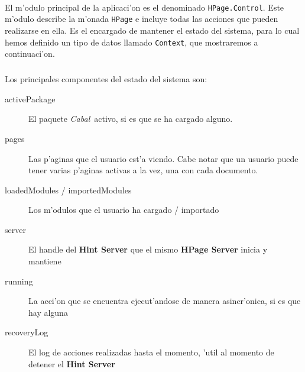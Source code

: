 \documentclass[a4paper]{article}
\newcommand{\cabal}{\textsl{Cabal}}
\begin{document}
\paragraph{}El m'odulo principal de la aplicaci'on es el denominado \texttt{HPage.Control}.  Este m'odulo describe la m'onada \texttt{HPage} e incluye todas las acciones que pueden realizarse en ella.  Es el encargado de mantener el estado del sistema, para lo cual hemos definido un tipo de datos llamado \texttt{Context}, que mostraremos a continuaci'on.
\subparagraph{} Los principales componentes del estado del sistema son:
\begin{description}
	\item[activePackage] El paquete \cabal\ activo, si es que se ha cargado alguno.
	\item[pages] Las p'aginas que el usuario est'a viendo.  Cabe notar que un usuario puede tener varias p'aginas activas a la vez, una con cada documento.
	\item[loadedModules / importedModules] Los m'odulos que el usuario ha cargado / importado
	\item[server] El handle del \textbf{Hint Server} que el mismo \textbf{HPage Server} inicia y mantiene
	\item[running] La acci'on que se encuentra ejecut'andose de manera asincr'onica, si es que hay alguna
	\item[recoveryLog] El log de acciones realizadas hasta el momento, 'util al momento de detener el \textbf{Hint Server}
\end{description}
\end{document}
